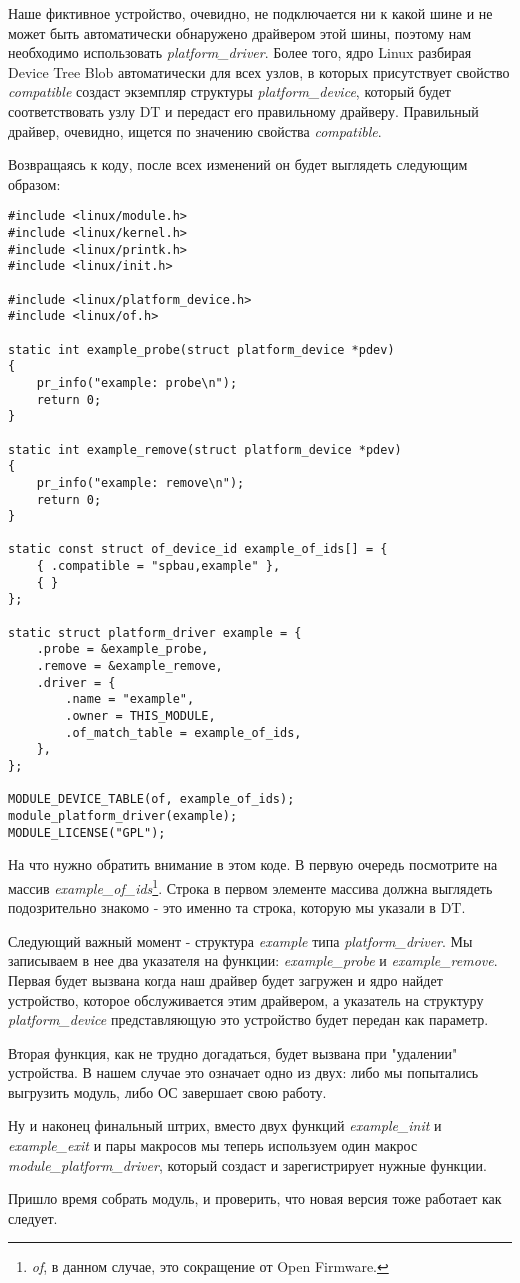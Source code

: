Наше фиктивное устройство, очевидно, не подключается ни к какой шине и не может
быть автоматически обнаружено драйвером этой шины, поэтому нам необходимо
использовать \emph{platform\_driver}. Более того, ядро Linux разбирая Device Tree
Blob автоматически для всех узлов, в которых присутствует свойство
\emph{compatible} создаст экземпляр структуры \emph{platform\_device}, который
будет соответствовать узлу DT и передаст его правильному драйверу. Правильный
драйвер, очевидно, ищется по значению свойства \emph{compatible}.

Возвращаясь к коду, после всех изменений он будет выглядеть следующим образом:
\begin{lstlisting}
#include <linux/module.h>
#include <linux/kernel.h>
#include <linux/printk.h>
#include <linux/init.h>

#include <linux/platform_device.h>
#include <linux/of.h>

static int example_probe(struct platform_device *pdev)
{
	pr_info("example: probe\n");
	return 0;
}

static int example_remove(struct platform_device *pdev)
{
	pr_info("example: remove\n");
	return 0;
}

static const struct of_device_id example_of_ids[] = {
	{ .compatible = "spbau,example" },
	{ }
};

static struct platform_driver example = {
	.probe = &example_probe,
	.remove = &example_remove,
	.driver = {
		.name = "example",
		.owner = THIS_MODULE,
		.of_match_table = example_of_ids,
	},
};

MODULE_DEVICE_TABLE(of, example_of_ids);
module_platform_driver(example);
MODULE_LICENSE("GPL");
\end{lstlisting}

На что нужно обратить внимание в этом коде. В первую очередь посмотрите на
массив \emph{example\_of\_ids}\footnote{\emph{of}, в данном случае, это
сокращение от Open Firmware.}. Строка в первом элементе массива должна выглядеть
подозрительно знакомо - это именно та строка, которую мы указали в DT.

Следующий важный момент - структура \emph{example} типа \emph{platform\_driver}.
Мы записываем в нее два указателя на функции: \emph{example\_probe} и
\emph{example\_remove}. Первая будет вызвана когда наш драйвер будет загружен и
ядро найдет устройство, которое обслуживается этим драйвером, а указатель на
структуру \emph{platform\_device} представляющую это устройство будет передан
как параметр.

Вторая функция, как не трудно догадаться, будет вызвана при "удалении"
устройства. В нашем случае это означает одно из двух: либо мы попытались
выгрузить модуль, либо ОС завершает свою работу.

Ну и наконец финальный штрих, вместо двух функций \emph{example\_init} и
\emph{example\_exit} и пары макросов мы теперь используем один макрос
\emph{module\_platform\_driver}, который создаст и зарегистрирует нужные
функции.

Пришло время собрать модуль, и проверить, что новая версия тоже работает как
следует.
